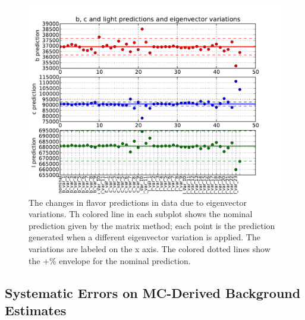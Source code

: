 \begin{figure}[hbt]
  \includegraphics[width=0.98\linewidth]{Systematics/eigenvector_variations.pdf}
  \caption{The changes in flavor predictions in data due to eigenvector variations.  Th
    colored line in each subplot shows the nominal prediction given by the matrix method;
    each point is the prediction generated when a different eigenvector variation is applied.
    The variations are labeled on the x axis.  The colored dotted lines show the +\%
    envelope for the nominal prediction.}
  \label{fig:eigenvector_variations}
\end{figure}

\subsection{Systematic Errors on MC-Derived Background Estimates}





